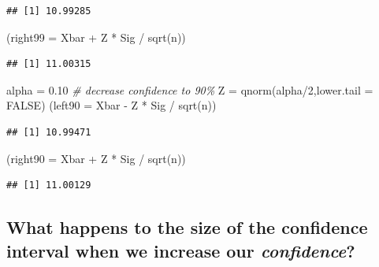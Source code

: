 \documentclass[
]{book}
\newenvironment{Shaded}{\begin{snugshade}}{\end{snugshade}}
\newcommand{\AttributeTok}[1]{\textcolor[rgb]{0.77,0.63,0.00}{#1}}
\newcommand{\CommentTok}[1]{\textcolor[rgb]{0.56,0.35,0.01}{\textit{#1}}}
\newcommand{\ConstantTok}[1]{\textcolor[rgb]{0.00,0.00,0.00}{#1}}
\newcommand{\DecValTok}[1]{\textcolor[rgb]{0.00,0.00,0.81}{#1}}
\newcommand{\FloatTok}[1]{\textcolor[rgb]{0.00,0.00,0.81}{#1}}
\newcommand{\FunctionTok}[1]{\textcolor[rgb]{0.00,0.00,0.00}{#1}}
\newcommand{\NormalTok}[1]{#1}
\newcommand{\OtherTok}[1]{\textcolor[rgb]{0.56,0.35,0.01}{#1}}
\newcommand{\SpecialCharTok}[1]{\textcolor[rgb]{0.00,0.00,0.00}{#1}}
\begin{document}
\begin{verbatim}
## [1] 10.99285
\end{verbatim}

\begin{Shaded}
\begin{Highlighting}[]
\NormalTok{(}\AttributeTok{right99 =}\NormalTok{ Xbar }\SpecialCharTok{+}\NormalTok{ Z }\SpecialCharTok{*}\NormalTok{ Sig }\SpecialCharTok{/} \FunctionTok{sqrt}\NormalTok{(n))}
\end{Highlighting}
\end{Shaded}

\begin{verbatim}
## [1] 11.00315
\end{verbatim}

\begin{Shaded}
\begin{Highlighting}[]
\NormalTok{alpha }\OtherTok{=} \FloatTok{0.10} \CommentTok{\# decrease confidence to 90\%}
\NormalTok{Z }\OtherTok{=} \FunctionTok{qnorm}\NormalTok{(alpha}\SpecialCharTok{/}\DecValTok{2}\NormalTok{,}\AttributeTok{lower.tail =} \ConstantTok{FALSE}\NormalTok{)}
\NormalTok{(}\AttributeTok{left90 =}\NormalTok{ Xbar }\SpecialCharTok{{-}}\NormalTok{ Z }\SpecialCharTok{*}\NormalTok{ Sig }\SpecialCharTok{/} \FunctionTok{sqrt}\NormalTok{(n))}
\end{Highlighting}
\end{Shaded}

\begin{verbatim}
## [1] 10.99471
\end{verbatim}

\begin{Shaded}
\begin{Highlighting}[]
\NormalTok{(}\AttributeTok{right90 =}\NormalTok{ Xbar }\SpecialCharTok{+}\NormalTok{ Z }\SpecialCharTok{*}\NormalTok{ Sig }\SpecialCharTok{/} \FunctionTok{sqrt}\NormalTok{(n))}
\end{Highlighting}
\end{Shaded}

\begin{verbatim}
## [1] 11.00129
\end{verbatim}

\hypertarget{what-happens-to-the-size-of-the-confidence-interval-when-we-increase-our-confidence}{%
\subsection{\texorpdfstring{What happens to the size of the confidence interval when we increase our \emph{confidence}?}{What happens to the size of the confidence interval when we increase our confidence?}}\label{what-happens-to-the-size-of-the-confidence-interval-when-we-increase-our-confidence}}
\end{document}
